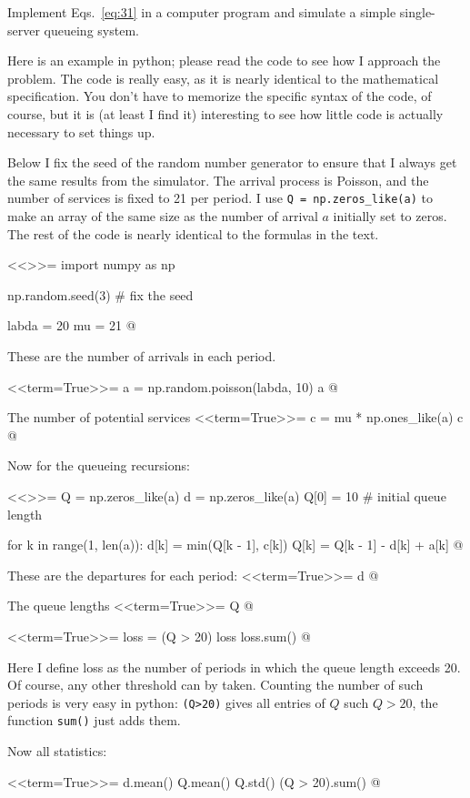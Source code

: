 \begin{question}
  Implement Eqs.~\ref{eq:31} in a computer program and simulate a
  simple single-server queueing system. 
  \begin{solution}
    Here is an example in python; please read the code to see how I
    approach the problem. The code is really easy, as it is nearly
    identical to the mathematical specification. You don't have to
    memorize the specific syntax of the code, of course, but it is (at
    least I find it) interesting to see how little code is actually
    necessary to set things up.


    Below I fix the seed of the random number generator to ensure that
    I always get the same results from the simulator.  The arrival
    process is Poisson, and the number of services is fixed to 21 per
    period. I use \texttt{Q = np.zeros\_like(a)} to make an array of the
    same size as the number of arrival $a$ initially set to zeros. The
    rest of the code is nearly identical to the formulas in the text.

<<>>=
import numpy as np

np.random.seed(3) # fix the seed

labda = 20
mu = 21
@

These are the number of arrivals in each period.

<<term=True>>=
a = np.random.poisson(labda, 10)
a
@

The number of potential services
<<term=True>>=
c = mu * np.ones_like(a)
c
@ 

Now for the queueing recursions:

<<>>=
Q = np.zeros_like(a)
d = np.zeros_like(a)
Q[0] = 10  # initial queue length

for k in range(1, len(a)):
    d[k] = min(Q[k - 1], c[k])
    Q[k] = Q[k - 1] - d[k] + a[k]
@

These are the departures for each period:
<<term=True>>=
d
@

The queue lengths
<<term=True>>=
Q
@

<<term=True>>=
loss = (Q > 20)
loss
loss.sum()
@

Here I
define loss as the number of periods in which the queue length exceeds
20. Of course, any other threshold can by taken. Counting the number
of such periods is very easy in python: \texttt{(Q>20)} gives all
entries of $Q$ such $Q>20$, the function \texttt{sum()} just adds
them. 


Now all statistics:

<<term=True>>=
d.mean()
Q.mean()
Q.std()
(Q > 20).sum()
@


\end{solution}
\end{question}
